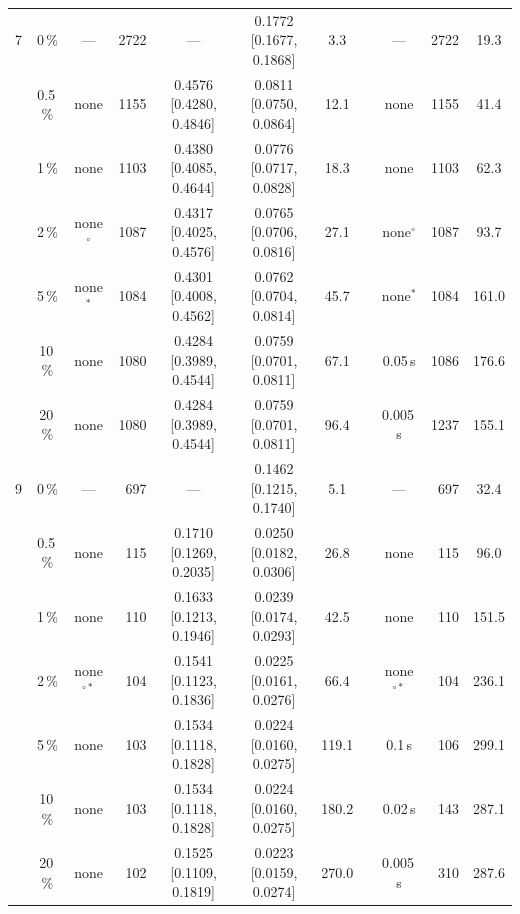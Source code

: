 \begin{tabular}{@{}cccrcccccrc@{}}
\midrule
7 & 0\,\% & --- & 2722 & --- & 0.1772 [0.1677, 0.1868] & 3.3 &  & --- & 2722 & 19.3 \\
 & 0.5\,\% & none & 1155 & 0.4576 [0.4280, 0.4846] & 0.0811 [0.0750, 0.0864] & 12.1 &  & none & 1155 & 41.4 \\
 & 1\,\% & none & 1103 & 0.4380 [0.4085, 0.4644] & 0.0776 [0.0717, 0.0828] & 18.3 &  & none & 1103 & 62.3 \\
 & 2\,\% & none$^{\circ}$ & 1087 & 0.4317 [0.4025, 0.4576] & 0.0765 [0.0706, 0.0816] & 27.1 &  & none$^{\circ}$ & 1087 & 93.7 \\
 & 5\,\% & none$^{\ast}$ & 1084 & 0.4301 [0.4008, 0.4562] & 0.0762 [0.0704, 0.0814] & 45.7 &  & none$^{\ast}$ & 1084 & 161.0 \\
 & 10\,\% & none & 1080 & 0.4284 [0.3989, 0.4544] & 0.0759 [0.0701, 0.0811] & 67.1 &  & 0.05\,s & 1086 & 176.6 \\
 & 20\,\% & none & 1080 & 0.4284 [0.3989, 0.4544] & 0.0759 [0.0701, 0.0811] & 96.4 &  & 0.005\,s & 1237 & 155.1 \\
\midrule
9 & 0\,\% & --- & 697 & --- & 0.1462 [0.1215, 0.1740] & 5.1 &  & --- & 697 & 32.4 \\
 & 0.5\,\% & none & 115 & 0.1710 [0.1269, 0.2035] & 0.0250 [0.0182, 0.0306] & 26.8 &  & none & 115 & 96.0 \\
 & 1\,\% & none & 110 & 0.1633 [0.1213, 0.1946] & 0.0239 [0.0174, 0.0293] & 42.5 &  & none & 110 & 151.5 \\
 & 2\,\% & none$^{\circ\ast}$ & 104 & 0.1541 [0.1123, 0.1836] & 0.0225 [0.0161, 0.0276] & 66.4 &  & none$^{\circ\ast}$ & 104 & 236.1 \\
 & 5\,\% & none & 103 & 0.1534 [0.1118, 0.1828] & 0.0224 [0.0160, 0.0275] & 119.1 &  & 0.1\,s & 106 & 299.1 \\
 & 10\,\% & none & 103 & 0.1534 [0.1118, 0.1828] & 0.0224 [0.0160, 0.0275] & 180.2 &  & 0.02\,s & 143 & 287.1 \\
 & 20\,\% & none & 102 & 0.1525 [0.1109, 0.1819] & 0.0223 [0.0159, 0.0274] & 270.0 &  & 0.005\,s & 310 & 287.6 \\
\bottomrule
\end{tabular}
